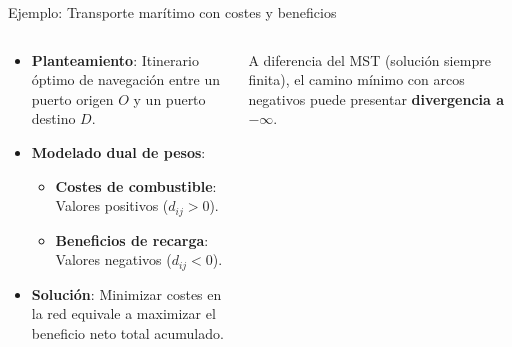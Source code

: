 \documentclass[
  ignorenonframetext,
]{beamer}
\providecommand{\tightlist}{%
  \setlength{\itemsep}{0pt}\setlength{\parskip}{0pt}}
\begin{document}
\begin{frame}{Ejemplo: Transporte marítimo con costes y beneficios}
\label{ejemplo-transporte-maruxedtimo-con-costes-y-beneficios}
\begin{columns}[T]
\begin{column}{0.55\linewidth}
\begin{itemize}
\tightlist
\item
  \textbf{Planteamiento}: Itinerario óptimo de navegación entre un
  puerto origen \(O\) y un puerto destino \(D\).
\item
  \textbf{Modelado dual de pesos}:

  \begin{itemize}
  \tightlist
  \item
    \textbf{Costes de combustible}: Valores positivos (\(d_{ij} > 0\)).
  \item
    \textbf{Beneficios de recarga}: Valores negativos (\(d_{ij} < 0\)).
  \end{itemize}
\item
  \textbf{Solución}: Minimizar costes en la red equivale a maximizar el
  beneficio neto total acumulado.
\end{itemize}
\end{column}

\begin{column}{0.45\linewidth}
\begin{tcolorbox}[enhanced jigsaw, colframe=quarto-callout-note-color-frame, toptitle=1mm, colback=white, colbacktitle=quarto-callout-note-color!10!white, titlerule=0mm, breakable, coltitle=black, opacityback=0, bottomrule=.15mm, title=\textcolor{quarto-callout-note-color}{\faInfo}\hspace{0.5em}{Diferencia fundamental con el MST}, rightrule=.15mm, arc=.35mm, leftrule=.75mm, left=2mm, toprule=.15mm, bottomtitle=1mm, opacitybacktitle=0.6]

A diferencia del MST (solución siempre finita), el camino mínimo con
arcos negativos puede presentar \textbf{divergencia a \(-\infty\)}.

\end{tcolorbox}
\end{column}
\end{columns}
\end{frame}
\end{document}

